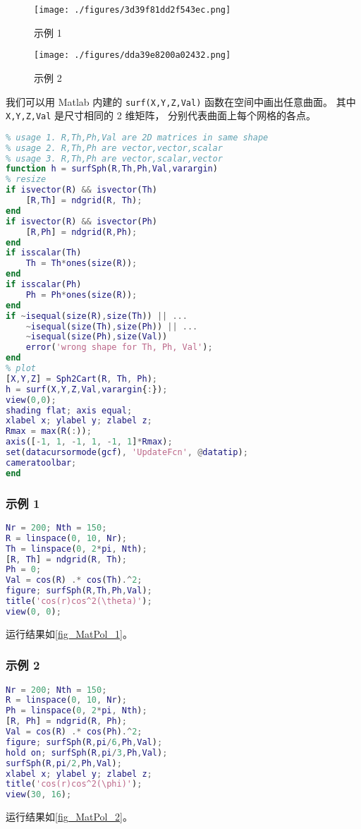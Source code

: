 
\begin{issues}
\issueAbstract
\end{issues}

\begin{figure}[ht]
\centering
\texttt{[image: ./figures/3d39f81dd2f543ec.png]}
\caption{示例 1} \label{fig_MatPol_1}
\end{figure}
\begin{figure}[ht]
\centering
\texttt{[image: ./figures/dda39e8200a02432.png]}
\caption{示例 2} \label{fig_MatPol_2}
\end{figure}

我们可以用 Matlab 内建的 \verb`surf(X,Y,Z,Val)` 函数在空间中画出任意曲面。 其中 \verb`X,Y,Z,Val` 是尺寸相同的 2 维矩阵， 分别代表曲面上每个网格的各点。
\begin{lstlisting}[language=matlab, caption=surfSph.m]
% surf() in spherical coordinate
% usage 1. R,Th,Ph,Val are 2D matrices in same shape
% usage 2. R,Th,Ph are vector,vector,scalar
% usage 3. R,Th,Ph are vector,scalar,vector
function h = surfSph(R,Th,Ph,Val,varargin)
% resize
if isvector(R) && isvector(Th)
    [R,Th] = ndgrid(R, Th);
end
if isvector(R) && isvector(Ph)
    [R,Ph] = ndgrid(R,Ph);
end
if isscalar(Th)
    Th = Th*ones(size(R));
end
if isscalar(Ph)
    Ph = Ph*ones(size(R));
end
if ~isequal(size(R),size(Th)) || ...
    ~isequal(size(Th),size(Ph)) || ...
    ~isequal(size(Ph),size(Val))
    error('wrong shape for Th, Ph, Val');
end
% plot
[X,Y,Z] = Sph2Cart(R, Th, Ph);
h = surf(X,Y,Z,Val,varargin{:});
view(0,0);
shading flat; axis equal;
xlabel x; ylabel y; zlabel z;
Rmax = max(R(:));
axis([-1, 1, -1, 1, -1, 1]*Rmax);
set(datacursormode(gcf), 'UpdateFcn', @datatip);
cameratoolbar;
end
\end{lstlisting}

\subsubsection{示例 1}
\begin{lstlisting}[language=matlab, caption=surfSph\_demo1.m]
Nr = 200; Nth = 150;
R = linspace(0, 10, Nr);
Th = linspace(0, 2*pi, Nth);
[R, Th] = ndgrid(R, Th);
Ph = 0;
Val = cos(R) .* cos(Th).^2;
figure; surfSph(R,Th,Ph,Val);
title('cos(r)cos^2(\theta)');
view(0, 0);
\end{lstlisting}
运行结果如\autoref{fig_MatPol_1}。

\subsubsection{示例 2}
\begin{lstlisting}[language=matlab, caption=surfSph\_demo2.m]
Nr = 200; Nth = 150;
R = linspace(0, 10, Nr);
Ph = linspace(0, 2*pi, Nth);
[R, Ph] = ndgrid(R, Ph);
Val = cos(R) .* cos(Ph).^2;
figure; surfSph(R,pi/6,Ph,Val);
hold on; surfSph(R,pi/3,Ph,Val);
surfSph(R,pi/2,Ph,Val);
xlabel x; ylabel y; zlabel z;
title('cos(r)cos^2(\phi)');
view(30, 16);
\end{lstlisting}
运行结果如\autoref{fig_MatPol_2}。

